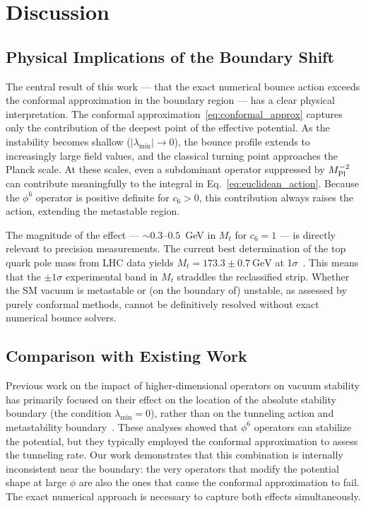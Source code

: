 \documentclass[aps,prd,twocolumn,superscriptaddress,nofootinbib]{revtex4-2}
\begin{document}
\section{Discussion}
\label{sec:discussion}

\subsection{Physical Implications of the Boundary Shift}
\label{subsec:physical_implications}

The central result of this work — that the exact numerical bounce action
exceeds the conformal approximation in the boundary region — has a clear
physical interpretation. The conformal approximation~\eqref{eq:conformal_approx}
captures only the contribution of the deepest point of the effective potential.
As the instability becomes shallow ($|\lambda_{\min}| \to 0$), the bounce
profile extends to increasingly large field values, and the classical turning
point approaches the Planck scale. At these scales, even a subdominant
operator suppressed by $M_{\rm Pl}^{-2}$ can contribute meaningfully to the
integral in Eq.~\eqref{eq:euclidean_action}. Because the $\phi^6$ operator
is positive definite for $c_6 > 0$, this contribution always raises the
action, extending the metastable region.

The magnitude of the effect — $\sim 0.3$--$0.5$~GeV in $M_t$ for $c_6 = 1$
— is directly relevant to precision measurements. The current best
determination of the top quark pole mass from LHC data yields
$M_t = 173.3 \pm 0.7~\text{GeV}$ at 1$\sigma$~\cite{PDG:2022,CMS:2022top}.
This means that the $\pm 1\sigma$ experimental band in $M_t$ straddles
the reclassified strip. Whether the SM vacuum is metastable or (on the
boundary of) unstable, as assessed by purely conformal methods, cannot be
definitively resolved without exact numerical bounce solvers.

\subsection{Comparison with Existing Work}
\label{subsec:comparison}

Previous work on the impact of higher-dimensional operators on vacuum
stability has primarily focused on their effect on the location of the
absolute stability boundary (the condition $\lambda_{\min} = 0$), rather
than on the tunneling action and metastability
boundary~\cite{Branchina:2013jra,Branchina:2014rva,Lalak:2014qua}.
These analyses showed that $\phi^6$ operators can stabilize the potential,
but they typically employed the conformal approximation to assess the
tunneling rate. Our work demonstrates that this combination is internally
inconsistent near the boundary: the very operators that modify the
potential shape at large $\phi$ are also the ones that cause the conformal
approximation to fail. The exact numerical approach is necessary to capture
both effects simultaneously.
\end{document}
